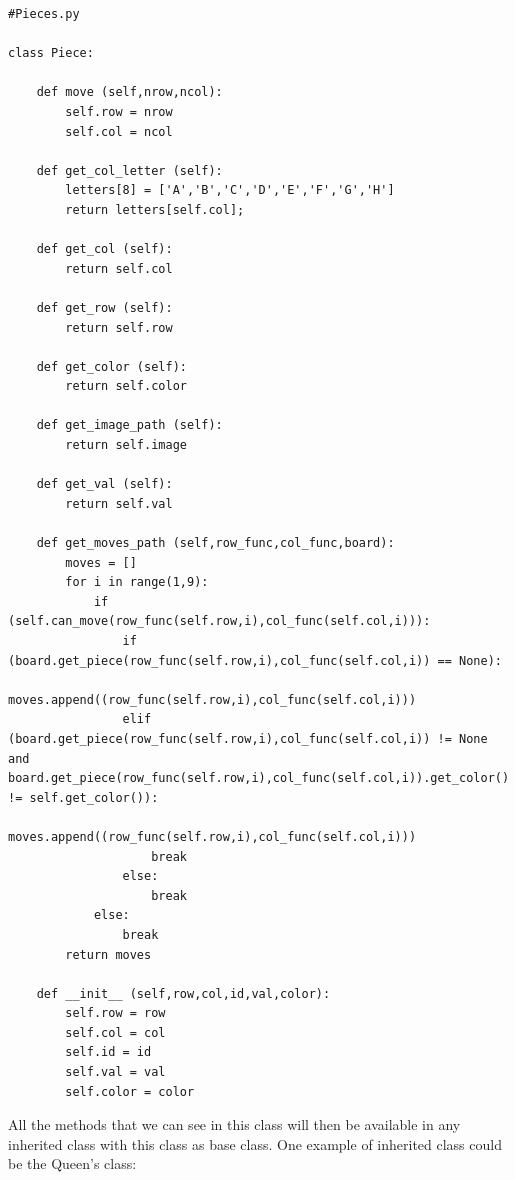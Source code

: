 \documentclass[english]{article}
\begin{document}
\begin{lstlisting}
#Pieces.py

class Piece:
        
    def move (self,nrow,ncol):
        self.row = nrow
        self.col = ncol

    def get_col_letter (self):
        letters[8] = ['A','B','C','D','E','F','G','H']
        return letters[self.col];

    def get_col (self):
        return self.col
    
    def get_row (self):
        return self.row
    
    def get_color (self):
        return self.color

    def get_image_path (self):
        return self.image

    def get_val (self):
        return self.val

    def get_moves_path (self,row_func,col_func,board):
        moves = []
        for i in range(1,9):
            if (self.can_move(row_func(self.row,i),col_func(self.col,i))):
                if (board.get_piece(row_func(self.row,i),col_func(self.col,i)) == None):
                    moves.append((row_func(self.row,i),col_func(self.col,i)))
                elif (board.get_piece(row_func(self.row,i),col_func(self.col,i)) != None and board.get_piece(row_func(self.row,i),col_func(self.col,i)).get_color() != self.get_color()):
                    moves.append((row_func(self.row,i),col_func(self.col,i)))
                    break
                else:
                    break
            else:
                break
        return moves

    def __init__ (self,row,col,id,val,color):
        self.row = row
        self.col = col
        self.id = id
        self.val = val
        self.color = color
\end{lstlisting}

All the methods that we can see in this class will then be available in any inherited class with this class as base class.
One example of inherited class could be the Queen's class:
\end{document}
